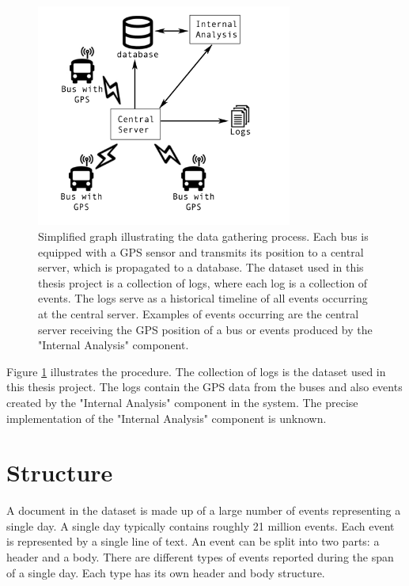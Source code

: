 \begin{figure}
    \centering
    \includegraphics[width=0.75\textwidth]{figures/data-gathering}
    \caption[Simplified graph illustrating the data gathering process]
    {\small Simplified graph illustrating the data gathering process. 
    Each bus is equipped with a GPS sensor and transmits its position to a central server, which is propagated to a database.
    The dataset used in this thesis project is a collection of logs, where each log is a collection of events.
    The logs serve as a historical timeline of all events occurring at the central server.
    Examples of events occurring are the central server receiving the GPS position of a bus or events produced by the "Internal Analysis" component.}
    \label{fig:data-gathering}
\end{figure}

Figure \ref{fig:data-gathering} illustrates the procedure.
The collection of logs is the dataset used in this thesis project.
The logs contain the GPS data from the buses and also events created by the "Internal Analysis" component in the system.
The precise implementation of the "Internal Analysis" component is unknown.

\section{Structure} \label{sec:data-structure}
A document in the dataset is made up of a large number of events representing a single day.
A single day typically contains roughly 21  million events.  
Each event is represented by a single line of text.
An event can be split into two parts: a header and a body.
There are different types of events reported during the span of a single day.
Each type has its own header and body structure.

